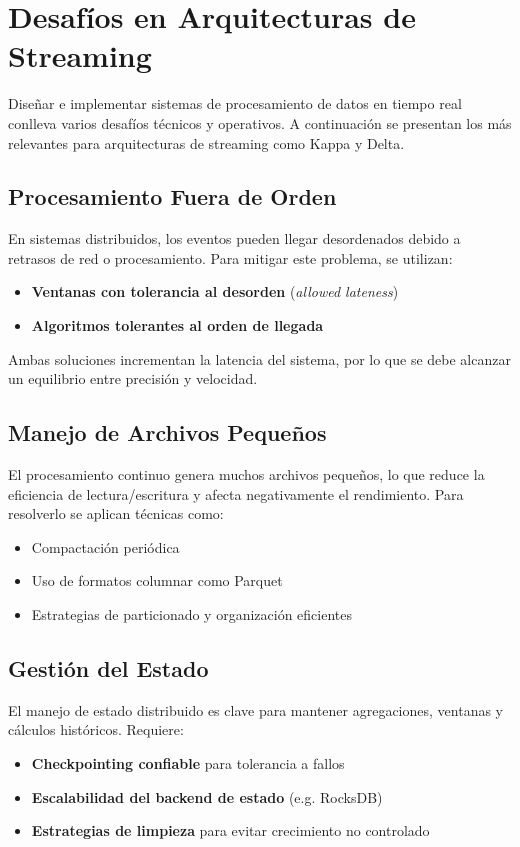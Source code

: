 \section{Desafíos en Arquitecturas de Streaming}
Diseñar e implementar sistemas de procesamiento de datos en tiempo real conlleva varios desafíos técnicos y operativos. A continuación se presentan los más relevantes para arquitecturas de streaming como Kappa y Delta.

\subsection{Procesamiento Fuera de Orden}
En sistemas distribuidos, los eventos pueden llegar desordenados debido a retrasos de red o procesamiento. Para mitigar este problema, se utilizan:
\begin{itemize}
    \item \textbf{Ventanas con tolerancia al desorden} (\textit{allowed lateness})
    \item \textbf{Algoritmos tolerantes al orden de llegada}
\end{itemize}
Ambas soluciones incrementan la latencia del sistema, por lo que se debe alcanzar un equilibrio entre precisión y velocidad.

\subsection{Manejo de Archivos Pequeños}
El procesamiento continuo genera muchos archivos pequeños, lo que reduce la eficiencia de lectura/escritura y afecta negativamente el rendimiento. Para resolverlo se aplican técnicas como:
\begin{itemize}
    \item Compactación periódica
    \item Uso de formatos columnar como Parquet
    \item Estrategias de particionado y organización eficientes
\end{itemize}

\subsection{Gestión del Estado}
El manejo de estado distribuido es clave para mantener agregaciones, ventanas y cálculos históricos. Requiere:
\begin{itemize}
    \item \textbf{Checkpointing confiable} para tolerancia a fallos
    \item \textbf{Escalabilidad del backend de estado} (e.g. RocksDB)
    \item \textbf{Estrategias de limpieza} para evitar crecimiento no controlado
\end{itemize}

